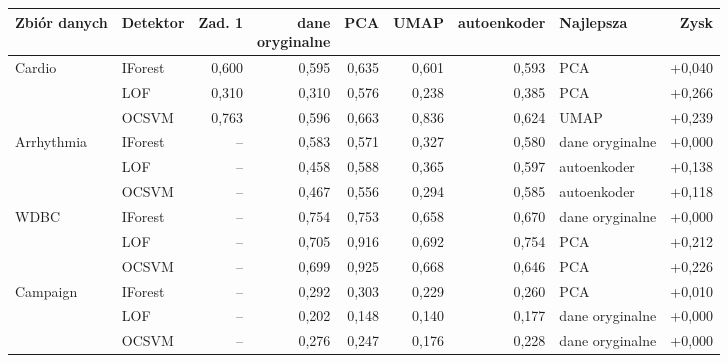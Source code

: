 \begin{tabular}{llrrrrrlr}
\toprule
Zbiór danych & Detektor & Zad. 1 & \makecell[r]{dane\\oryginalne} & PCA & UMAP & autoenkoder & Najlepsza & Zysk \\
\midrule
Cardio & IForest & 0,600 & 0,595 & 0,635 & 0,601 & 0,593 & PCA & +0,040 \\
 & LOF & 0,310 & 0,310 & 0,576 & 0,238 & 0,385 & PCA & +0,266 \\
 & OCSVM & 0,763 & 0,596 & 0,663 & 0,836 & 0,624 & UMAP & +0,239 \\
Arrhythmia & IForest & -- & 0,583 & 0,571 & 0,327 & 0,580 & dane oryginalne & +0,000 \\
 & LOF & -- & 0,458 & 0,588 & 0,365 & 0,597 & autoenkoder & +0,138 \\
 & OCSVM & -- & 0,467 & 0,556 & 0,294 & 0,585 & autoenkoder & +0,118 \\
WDBC & IForest & -- & 0,754 & 0,753 & 0,658 & 0,670 & dane oryginalne & +0,000 \\
 & LOF & -- & 0,705 & 0,916 & 0,692 & 0,754 & PCA & +0,212 \\
 & OCSVM & -- & 0,699 & 0,925 & 0,668 & 0,646 & PCA & +0,226 \\
Campaign & IForest & -- & 0,292 & 0,303 & 0,229 & 0,260 & PCA & +0,010 \\
 & LOF & -- & 0,202 & 0,148 & 0,140 & 0,177 & dane oryginalne & +0,000 \\
 & OCSVM & -- & 0,276 & 0,247 & 0,176 & 0,228 & dane oryginalne & +0,000 \\
\bottomrule
\end{tabular}
